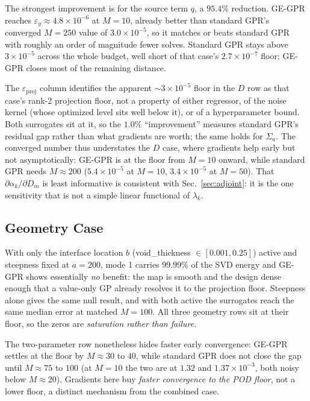 \documentclass[]{ANStopical}
\begin{document}
The strongest improvement is for the source term $q$, a $95.4\%$ reduction. GE-GPR reaches $\varepsilon_y\approx4.8\times10^{-6}$ at $M{=}10$, already better than standard GPR's converged $M{=}250$ value of $3.0\times10^{-5}$, so it matches or beats standard GPR with roughly an order of magnitude fewer solves. Standard GPR stays above $3\times10^{-5}$ across the whole budget, well short of that case's $2.7\times10^{-7}$ floor; GE-GPR closes most of the remaining distance.

The $\varepsilon_{\mathrm{proj}}$ column identifies the apparent $\sim3\times10^{-5}$ floor in the $D$ row as that case's rank-$2$ projection floor, not a property of either regressor, of the noise kernel (whose optimized level sits well below it), or of a hyperparameter bound. Both surrogates sit at it, so the $1.0\%$ ``improvement'' measures standard GPR's residual gap rather than what gradients are worth; the same holds for $\Sigma_a$. The converged number thus understates the $D$ case, where gradients help early but not asymptotically: GE-GPR is at the floor from $M{=}10$ onward, while standard GPR needs $M\approx200$ ($5.4\times10^{-5}$ at $M{=}10$, $3.4\times10^{-5}$ at $M{=}50$). That $\partial\alpha_k/\partial D_m$ is least informative is consistent with Sec.~\ref{sec:adjoint}: it is the one sensitivity that is not a simple linear functional of $\lambda_k$.

\subsection{Geometry Case}\label{sec:results-geometry}

With only the interface location $b$ (void\_thickness $\in[0.001,0.25]$) active and steepness fixed at $a{=}200$, mode 1 carries $99.99\%$ of the SVD energy and GE-GPR shows essentially \emph{no} benefit: the map is smooth and the design dense enough that a value-only GP already resolves it to the projection floor. Steepness alone gives the same null result, and with both active the surrogates reach the same median error at matched $M{=}100$. All three geometry rows sit at their floor, so the zeros are \emph{saturation rather than failure}.

The two-parameter row nonetheless hides faster early convergence: GE-GPR settles at the floor by $M{\approx}30$ to $40$, while standard GPR does not close the gap until $M{\approx}75$ to $100$ (at $M{=}10$ the two are at $1.32$ and $1.37\times10^{-3}$, both noisy below $M{\approx}20$). Gradients here buy \emph{faster convergence to the POD floor}, not a lower floor, a distinct mechanism from the combined case.
\end{document}
